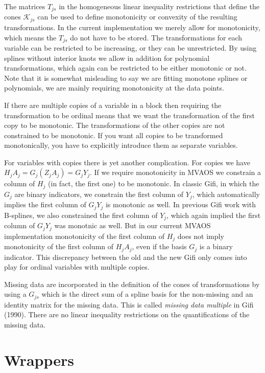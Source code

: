 \documentclass[
  12pt,
  letterpaper,
  DIV=11,
  numbers=noendperiod]{scrreprt}
\begin{document}
The matrices \(T_{js}\) in the homogeneous linear inequality
restrictions that define the cones \(\mathcal{K}_{js}\) can be used to
define monotonicity or convexity of the resulting transformations. In
the current implementation we merely allow for monotonicity, which means
the \(T_{js}\) do not have to be stored. The transformations for each
variable can be restricted to be increasing, or they can be
unrestricted. By using splines without interior knots we allow in
addition for polynomial transformations, which again can be restricted
to be either monotonic or not. Note that it is somewhat misleading to
say we are fitting monotone splines or polynomials, we are mainly
requiring monotonicity at the data points.

If there are multiple copies of a variable in a block then requiring the
transformation to be ordinal means that we want the transformation of
the first copy to be monotonic. The transformations of the other copies
are not constrained to be monotonic. If you want all copies to be
transformed monotonically, you have to explicitly introduce them as
separate variables.

For variables with copies there is yet another complication. For copies
we have \(H_jA_j=G_j(Z_jA_j)=G_jY_j\). If we require monotonicity in
MVAOS we constrain a column of \(H_j\) (in fact, the first one) to be
monotonic. In classic Gifi, in which the \(G_j\) are binary indicators,
we constrain the first column of \(Y_j\), which automatically implies
the first column of \(G_jY_j\) is monotonic as well. In previous Gifi
work with B-splines, we also constrained the first column of \(Y_j\),
which again implied the first column of \(G_jY_j\) was monotnic as well.
But in our current MVAOS implementation monotonicity of the first column
of \(H_j\) does not imply monotonicity of the first column of
\(H_jA_j\), even if the basis \(G_j\) is a binary indicator. This
discrepancy between the old and the new Gifi only comes into play for
ordinal variables with multiple copies.

Missing data are incorporated in the definition of the cones of
transformations by using a \(G_{js}\) which is the direct sum of a
spline basis for the non-missing and an identity matrix for the missing
data. This is called \emph{missing data multiple} in Gifi (1990). There
are no linear inequality restrictions on the quantifications of the
missing data.

\section{Wrappers}\label{wrappers}
\end{document}
